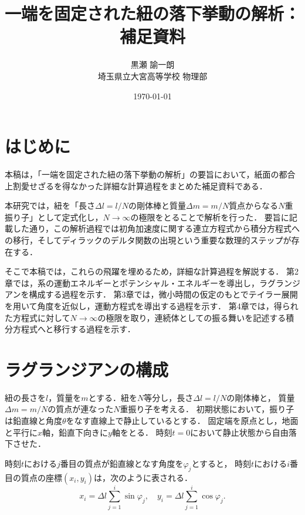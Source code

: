 \documentclass[11pt, a4paper]{ltjsarticle}
\title{一端を固定された紐の落下挙動の解析：補足資料}
\author{黒瀬 諭一朗 \\ 埼玉県立大宮高等学校 物理部}
\date{\today}
\begin{document}
\maketitle

\section{はじめに}
本稿は，「一端を固定された紐の落下挙動の解析」の要旨において，紙面の都合上割愛せざるを得なかった詳細な計算過程をまとめた補足資料である．

本研究では，紐を「長さ$\Delta l = l/N$の剛体棒と質量$\Delta m = m/N$質点からなる$N$重振り子」として定式化し，$N\rightarrow\infty$の極限をとることで解析を行った．
要旨に記載した通り，この解析過程では初角加速度に関する連立方程式から積分方程式への移行，そしてディラックのデルタ関数の出現という重要な数理的ステップが存在する．

そこで本稿では，これらの飛躍を埋めるため，詳細な計算過程を解説する．
第2章では，系の運動エネルギーとポテンシャル・エネルギーを導出し，ラグランジアンを構成する過程を示す．
第3章では，微小時間の仮定のもとでテイラー展開を用いて角度を近似し，運動方程式を導出する過程を示す．
第4章では，得られた方程式に対して$N \rightarrow\infty$の極限を取り，連続体としての振る舞いを記述する積分方程式へと移行する過程を示す．

\section{ラグランジアンの構成}
紐の長さを$l$，質量を$m$とする．紐を$N$等分し，長さ$\Delta l = l/N$の剛体棒と，
質量$\Delta m = m/N$の質点が連なった$N$重振り子を考える．
初期状態において，振り子は鉛直線と角度$\theta$をなす直線上で静止しているとする．
固定端を原点とし，地面と平行に$x$軸，鉛直下向きに$y$軸をとる．
時刻$t = 0$において静止状態から自由落下させた．

時刻$t$における$j$番目の質点が鉛直線となす角度を$\varphi_j$とすると，
時刻$t$における$i$番目の質点の座標$\left(x_i, y_i\right)$は，次のように表される．
\begin{equation*}
  x_i = \Delta l \sum_{j = 1}^{i} \sin \varphi_j, \quad
  y_i = \Delta l \sum_{j = 1}^{i} \cos \varphi_j.
\end{equation*}
\end{document}
